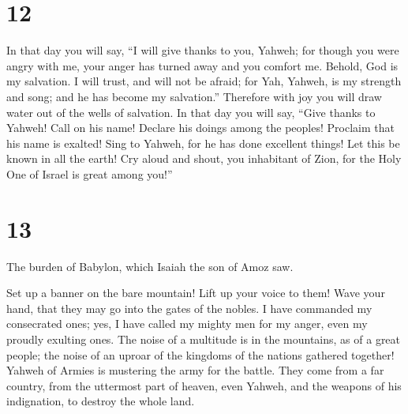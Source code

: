 \hypertarget{section-11}{%
\section{12}\label{section-11}}

 In that day you will say, ``I will give thanks to you,
Yahweh; for though you were angry with me, your anger has turned away
and you comfort me.  Behold, God is my salvation. I will
trust, and will not be afraid; for Yah, Yahweh, is my strength and song;
and he has become my salvation.''  Therefore with joy you
will draw water out of the wells of salvation.  In that day
you will say, ``Give thanks to Yahweh! Call on his name! Declare his
doings among the peoples! Proclaim that his name is exalted!
 Sing to Yahweh, for he has done excellent things! Let this
be known in all the earth!  Cry aloud and shout, you
inhabitant of Zion, for the Holy One of Israel is great among you!''

\hypertarget{section-12}{%
\section{13}\label{section-12}}

 The burden of Babylon, which Isaiah the son of Amoz saw.

 Set up a banner on the bare mountain! Lift up your voice to
them! Wave your hand, that they may go into the gates of the nobles.
 I have commanded my consecrated ones; yes, I have called my
mighty men for my anger, even my proudly exulting ones.  The
noise of a multitude is in the mountains, as of a great people; the
noise of an uproar of the kingdoms of the nations gathered together!
Yahweh of Armies is mustering the army for the battle.  They
come from a far country, from the uttermost part of heaven, even Yahweh,
and the weapons of his indignation, to destroy the whole land.


